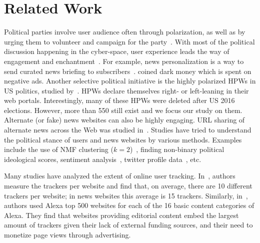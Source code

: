 \documentclass{article}
\newcommand{\hpws}{HPWs\xspace}
\begin{document}
\section{Related Work}
\label{Sec:related}

Political parties involve user audience often through polarization, as well as by urging them to volunteer and campaign for the party~\cite{ballard2016campaigning}.
With most of the political discussion happening in the cyber-space, user experience leads the way of engagement and enchantment~\cite{mccarthy2006experience, agarwal2019tweeting}.
For example, news personalization is a way to send curated news briefing to subscribers~\cite{messing2014selective,thurman2012future}.
\cite{chand2017dark} coined dark money which is spent on negative ads.
Another selective political initiative is the highly polarized \hpws in US politics, studied by~\cite{bhatt2018illuminating}.
\hpws declare themselves right- or left-leaning in their web portals.
Interestingly, many of these \hpws were deleted after US 2016 elections. 
However, more than 550 still exist and we focus our study on them.
Alternate (or fake) news websites can also be highly engaging.
URL sharing of alternate news across the Web was studied in~\cite{zannettou2017web}.
Studies have tried to understand the political stance of users and news websites by various methods.
Examples include the use of NMF clustering ($k=2$)~\cite{lahoti2018joint}, finding non-binary political ideological scores, sentiment analysis~\cite{pla2014political}, twitter profile data~\cite{pennacchiotti2011democrats}, etc.


Many studies have analyzed the extent of online user tracking.
In~\cite{karaj2018whotracks}, authors measure the trackers per website and find that, on average, there are 10 different trackers per website; in news websites this average is 15 trackers.
Similarly, in~\cite{englehardt2016online}, authors used Alexa top 500 websites for each of the 16 basic content categories of Alexa.
They find that websites providing editorial content embed the largest amount of trackers given their lack of external funding sources, and their need to monetize page views through advertising.
\end{document}
